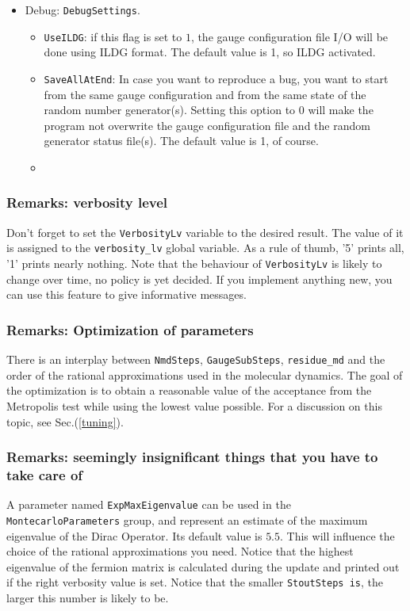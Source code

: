 \begin{itemize}
\begin{itemize}
   \end{itemize}

   
   
        
        
    \item{Debug: \verb|DebugSettings|.}
    \begin{itemize}
    \item \verb|UseILDG|: if this flag is set to $1$, the gauge configuration 
file  I/O will be done using ILDG format. The default value is 1, so ILDG 
activated.
    \item \verb|SaveAllAtEnd|: In case you want to reproduce a bug, you want to 
start from the same gauge configuration and from the same state of the random 
number generator(s). Setting this option to 0 will make the program not 
overwrite the gauge configuration file and the random generator status file(s). 
The default value is 1, of course.
    \item 
\end{itemize}
\end{itemize}


\subsubsection{Remarks: verbosity level}
Don't forget to set the \verb|VerbosityLv| variable to the desired result. 
The value of it is assigned to the \verb|verbosity_lv| global variable.
As a rule of thumb, '5' prints all, '1' prints nearly nothing. Note
that the behaviour of \verb|VerbosityLv| is likely to change over time, no
policy is yet decided. If you implement anything new, you can use this 
feature to give informative messages.

\subsubsection{Remarks: Optimization of parameters}

There is an interplay between \verb|NmdSteps|, \verb|GaugeSubSteps|,
\verb|residue_md| and the order of the rational approximations used in the 
molecular dynamics. The goal of the optimization is to obtain a reasonable 
value of the acceptance from the Metropolis test while using the lowest value 
possible. For a discussion on this topic, see Sec.(\ref{tuning}).


\subsubsection{Remarks: seemingly insignificant things that you have to take 
care of}
A parameter named \verb|ExpMaxEigenvalue| can be used in the 
\verb|MontecarloParameters| group, and represent an estimate
of the maximum eigenvalue of the Dirac Operator. Its default value is $5.5$.  
This will influence  the choice of the rational approximations you need. 
Notice that the highest eigenvalue of the fermion matrix is calculated during 
the update and printed out if the right verbosity value is set. Notice that the 
smaller \verb|StoutSteps is|, the larger this number is likely to be. 


